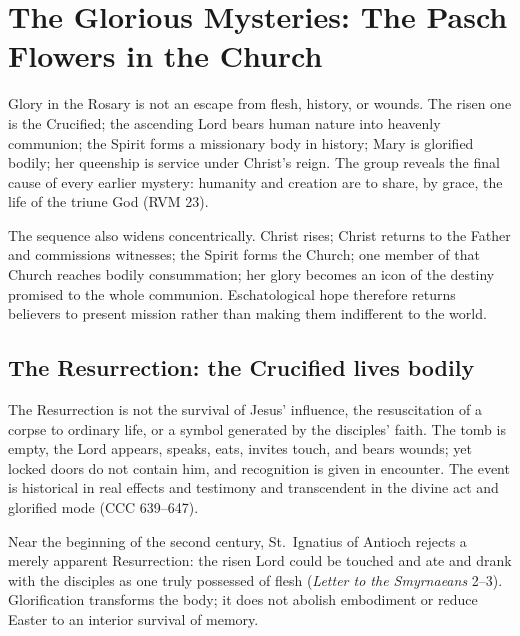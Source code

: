 \section{The Glorious Mysteries: The Pasch Flowers in the Church}

Glory in the Rosary is not an escape from flesh, history, or wounds. The risen one is the Crucified; the ascending Lord bears human nature into heavenly communion; the Spirit forms a missionary body in history; Mary is glorified bodily; her queenship is service under Christ's reign. The group reveals the final cause of every earlier mystery: humanity and creation are to share, by grace, the life of the triune God (RVM 23).

The sequence also widens concentrically. Christ rises; Christ returns to the Father and commissions witnesses; the Spirit forms the Church; one member of that Church reaches bodily consummation; her glory becomes an icon of the destiny promised to the whole communion. Eschatological hope therefore returns believers to present mission rather than making them indifferent to the world.

\subsection{The Resurrection: the Crucified lives bodily}


The Resurrection is not the survival of Jesus' influence, the resuscitation of a corpse to ordinary life, or a symbol generated by the disciples' faith. The tomb is empty, the Lord appears, speaks, eats, invites touch, and bears wounds; yet locked doors do not contain him, and recognition is given in encounter. The event is historical in real effects and testimony and transcendent in the divine act and glorified mode (CCC 639--647).

Near the beginning of the second century, St.~Ignatius of Antioch rejects a merely apparent Resurrection: the risen Lord could be touched and ate and drank with the disciples as one truly possessed of flesh (\emph{Letter to the Smyrnaeans} 2--3). Glorification transforms the body; it does not abolish embodiment or reduce Easter to an interior survival of memory.

